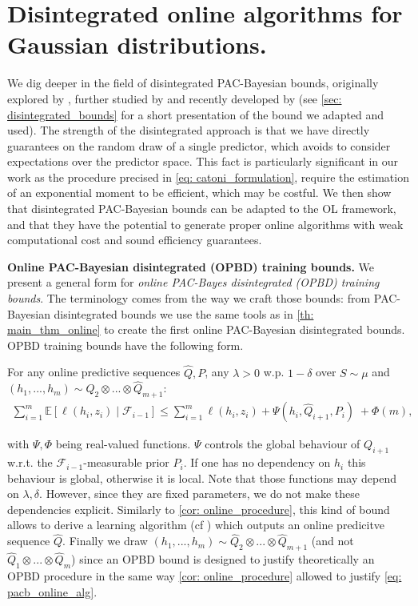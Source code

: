 \section{Disintegrated online algorithms for Gaussian distributions.}
\label{sec: OPBD_procedure}
We dig deeper in the field of disintegrated PAC-Bayesian bounds, originally explored by \citet{catoni2007pac,blanchard2007occam}, further studied by \citet{alquier2013sparse,guedj2013pac} and recently developed by \citet{rivasplata2020pac,viallard2023general} (see \cref{sec: disintegrated_bounds} for a short presentation of the bound we adapted and used). The strength of the disintegrated approach is that we have directly guarantees on the random draw of a single predictor, which avoids to consider expectations over the predictor space.
This fact is particularly significant in our work as the procedure precised in \cref{eq: catoni_formulation}, require the estimation of an exponential moment to be efficient, which may be costful.
We then show that disintegrated PAC-Bayesian bounds can be adapted to the OL framework, and that they have the potential to generate proper online algorithms with weak computational cost and sound efficiency guarantees.

\textbf{Online PAC-Bayesian disintegrated (OPBD) training bounds.} We present a general form for \emph{online PAC-Bayes disintegrated (OPBD) training bounds}. The terminology comes from the way we craft those bounds: from PAC-Bayesian disintegrated bounds we use the same tools as in \cref{th: main_thm_online} to create the first online PAC-Bayesian disintegrated bounds.
OPBD training bounds have the following form.

For any online predictive sequences $\hat{Q},P$, any $\lambda>0$ w.p. $1-\delta$ over $S\sim \mu$ and $(h_1,...,h_{m})\sim \hat{Q}_2\otimes...\otimes \hat{Q}_{m+1}$:
\begin{align}
  \label{eq: OPBD_train_bound}
  \sum_{i=1}^m  \mathbb{E}[\ell(h_i,z_i) \mid \mathcal{F}_{i-1}]   \leq \sum_{i=1}^m  \ell(h_i,z_i)  + \Psi(h_{i},\hat{Q}_{i+1},P_i) \; + \Phi(m),
\end{align}

with $\Psi,\Phi$ being real-valued functions. $\Psi$ controls the global behaviour of $Q_{i+1}$ w.r.t. the $\mathcal{F}_{i-1}$-measurable prior $P_{i}$. If one has no dependency on $h_i$ this behaviour is global, otherwise it is local.
Note that those functions may depend on $\lambda,\delta$. However, since they are fixed parameters, we do not make these dependencies explicit.
Similarly to \cref{cor: online_procedure}, this kind of bound allows to derive a learning algorithm (cf ) which outputs an online predicitve sequence $\hat{Q}$.
Finally we draw $(h_1,...,h_{m})\sim \hat{Q}_2\otimes...\otimes \hat{Q}_{m+1}$ (and not $\hat{Q}_1\otimes...\otimes \hat{Q}_{m}$)  since an OPBD bound is designed to justify theoretically an OPBD procedure in the same way \cref{cor: online_procedure} allowed to justify \cref{eq: pacb_online_alg}.


